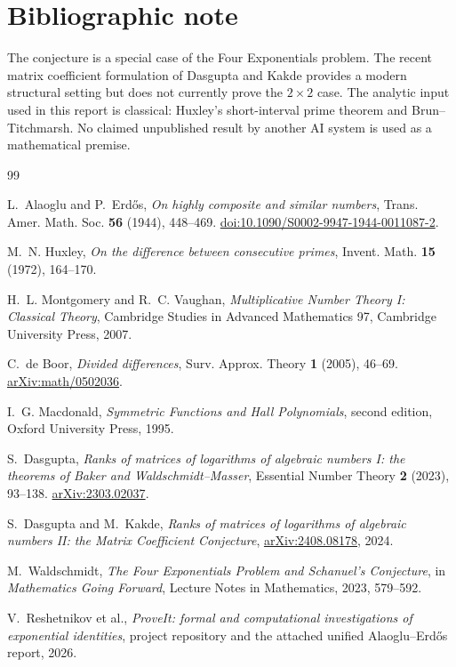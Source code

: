 \documentclass[11pt,oneside]{article}
\theoremstyle{definition}
\theoremstyle{remark}
\begin{document}
\section{Bibliographic note}

The conjecture is a special case of the Four Exponentials problem.  The recent matrix
coefficient formulation of Dasgupta and Kakde provides a modern structural setting but does
not currently prove the $2\times2$ case.  The analytic input used in this report is classical:
Huxley's short-interval prime theorem and Brun--Titchmarsh.  No claimed unpublished result by
another AI system is used as a mathematical premise.

\begin{thebibliography}{99}

L.~Alaoglu and P.~Erd\H{o}s,
\newblock \emph{On highly composite and similar numbers},
\newblock Trans. Amer. Math. Soc. \textbf{56} (1944), 448--469.
\newblock \href{https://doi.org/10.1090/S0002-9947-1944-0011087-2}{doi:10.1090/S0002-9947-1944-0011087-2}.

M.~N. Huxley,
\newblock \emph{On the difference between consecutive primes},
\newblock Invent. Math. \textbf{15} (1972), 164--170.

H.~L. Montgomery and R.~C. Vaughan,
\newblock \emph{Multiplicative Number Theory I: Classical Theory},
\newblock Cambridge Studies in Advanced Mathematics 97, Cambridge University Press, 2007.

C.~de Boor,
\newblock \emph{Divided differences},
\newblock Surv. Approx. Theory \textbf{1} (2005), 46--69.
\newblock \href{https://arxiv.org/abs/math/0502036}{arXiv:math/0502036}.

I.~G. Macdonald,
\newblock \emph{Symmetric Functions and Hall Polynomials}, second edition,
\newblock Oxford University Press, 1995.

S.~Dasgupta,
\newblock \emph{Ranks of matrices of logarithms of algebraic numbers I: the theorems of
Baker and Waldschmidt--Masser},
\newblock Essential Number Theory \textbf{2} (2023), 93--138.
\newblock \href{https://arxiv.org/abs/2303.02037}{arXiv:2303.02037}.

S.~Dasgupta and M.~Kakde,
\newblock \emph{Ranks of matrices of logarithms of algebraic numbers II: the Matrix
Coefficient Conjecture},
\newblock \href{https://arxiv.org/abs/2408.08178}{arXiv:2408.08178}, 2024.

M.~Waldschmidt,
\newblock \emph{The Four Exponentials Problem and Schanuel's Conjecture},
\newblock in \emph{Mathematics Going Forward}, Lecture Notes in Mathematics, 2023,
579--592.

V.~Reshetnikov et al.,
\newblock \emph{ProveIt: formal and computational investigations of exponential identities},
\newblock project repository and the attached unified Alaoglu--Erd\H{o}s report, 2026.

\end{thebibliography}
\end{document}
